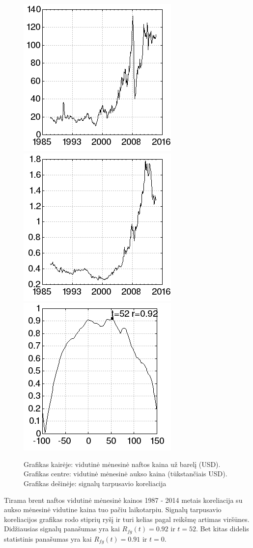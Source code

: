 \begin{figure}
\includegraphics[scale=0.65]{../scripts/oil_gold/oil.png}
\includegraphics[scale=0.65]{../scripts/oil_gold/gold.png}
\includegraphics[scale=0.65]{../scripts/oil_gold/result.png}
    \caption{Grafikas kairėje: vidutinė mėnesinė naftos kaina už barelį (USD). Grafikas centre: vidutinė mėnesinė aukso kaina (tūkstančiais USD). Grafikas dešinėje: signalų tarpusavio koreliacija}
\end{figure}

Tirama brent naftos vidutinė mėnesinė kainos\cite{oil} 1987 - 2014 metais koreliacija su aukso mėnesinė vidutine kaina\cite{gold} tuo pačiu laikotarpiu.
Signalų tarpusavio koreliacijos grafikas rodo stiprių ryšį ir turi kelias pagal reikšmę artimas viršūnes.
Didžiausias signalų panašumas yra kai \( R_{fg}(t) = 0.92 \) ir \( t = 52 \).
Bet kitas didelis statistinis panašumas yra kai \( R_{fg}(t) = 0.91 \) ir \( t = 0 \).

